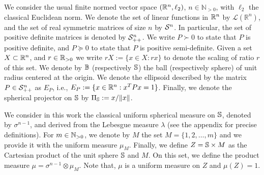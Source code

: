 We consider the usual finite normed vector space $(\mathbb{R}^n,\ell_2)$, $n \in \mathbb{N}_{> 0}$, with $\ell_2$ the classical Euclidean norm. We denote the set of linear functions in $\mathbb{R}^n$ by $\mathcal{L}(\mathbb{R}^n)$, and the set of real symmetric matrices of size $n$ by $\mathcal{S}^n$. In particular, the set of positive definite matrices is denoted by $\mathcal{S}^n_{++}$. We write $P \succ 0$ to state that $P$ is positive definite, and $P \succeq 0$ to state that $P$ is positive semi-definite. Given a set $X \subset \mathbb{R}^n$, and $r \in \mathbb{R}_{> 0}$ we write \mbox{$rX := \{x \in X : rx\}$} to denote the scaling of ratio $r$ of this set. We denote by $\mathbb{B}$ (respectively $\mathbb{S}$) the ball (respectively sphere) of unit radius centered at the origin.  We denote the ellipsoid described by the matrix $P \in \mathcal{S}^n_{++}$ as $E_P$, i.e., $E_P:= \{x \in \mathbb{R}^n: x^TPx = 1\}$. Finally, we denote the spherical projector on $\mathbb{S}$ by $\Pi_{\mathbb{S}} := x/\Vert x\Vert$. %



\noindent
We consider in this work the classical uniform spherical measure on $\mathbb{S}$, denoted by $\sigma^{n-1}$, and derived from the Lebesgue measure $\lambda$ (see the appendix for precise definitions). For $m \in \mathbb{N}_{>0}$, we denote by $M$ the set $M=\{1,2, \ldots,m \}$ and we provide it with the uniform measure $\mu_M$. Finally, we define $Z = \mathbb{S} \times M$ as the Cartesian product of the unit sphere $\mathbb{S}$ and $M$. On this set, we define the product measure $\mu = \sigma^{n-1} \otimes \mu_M$. Note that, $\mu$ is a uniform measure on $Z$ and $\mu(Z)=1$.  


